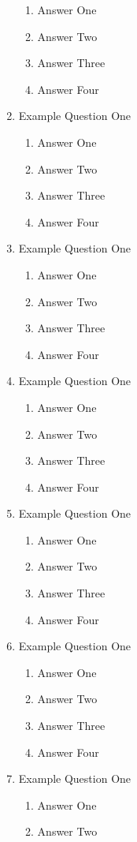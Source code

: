 \documentclass[11pt,fleqn]{article}
\begin{document}
\begin{enumerate}
\begin{enumerate}
	\item Answer One
	\item Answer Two
	\item Answer Three
	\item Answer Four
	\end{enumerate}
\item Example Question One
	\begin{enumerate}
	\item Answer One
	\item Answer Two
	\item Answer Three
	\item Answer Four
	\end{enumerate}
\item Example Question One
	\begin{enumerate}
	\item Answer One
	\item Answer Two
	\item Answer Three
	\item Answer Four
	\end{enumerate}
\item Example Question One
	\begin{enumerate}
	\item Answer One
	\item Answer Two
	\item Answer Three
	\item Answer Four
	\end{enumerate}
\item Example Question One
	\begin{enumerate}
	\item Answer One
	\item Answer Two
	\item Answer Three
	\item Answer Four
	\end{enumerate}
\item Example Question One
	\begin{enumerate}
	\item Answer One
	\item Answer Two
	\item Answer Three
	\item Answer Four
	\end{enumerate}
\item Example Question One
	\begin{enumerate}
	\item Answer One
	\item Answer Two

\end{enumerate}
\end{enumerate}
\end{document}
